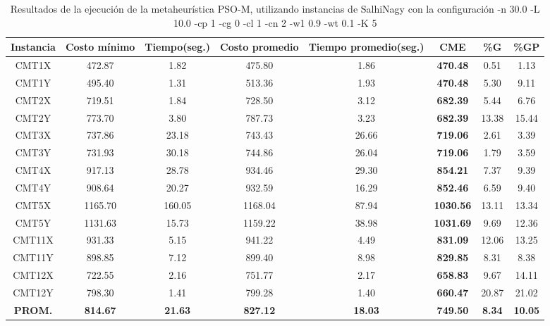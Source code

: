 \begin{table}[h]
\caption{Resultados de la ejecución de la metaheurística PSO-M, utilizando instancias de SalhiNagy con la configuración -n 30.0 -L 10.0 -cp 1 -cg 0 -cl 1 -cn 2 -w1 0.9 -wt 0.1 -K 5}
\centering
\small
\begin{tabular}{c c c c c c c c}
\hline\hline
Instancia & Costo mínimo & Tiempo(seg.) & Costo promedio & Tiempo promedio(seg.) & CME & \%G & \%GP \\ [0.5ex]
\hline
CMT1X & 472.87 & 1.82 & 
475.80 & 1.86 & \bf{470.48} & 
0.51 & 1.13\\CMT1Y & 495.40 & 1.31 & 
513.36 & 1.93 & \bf{470.48} & 
5.30 & 9.11\\CMT2X & 719.51 & 1.84 & 
728.50 & 3.12 & \bf{682.39} & 
5.44 & 6.76\\CMT2Y & 773.70 & 3.80 & 
787.73 & 3.23 & \bf{682.39} & 
13.38 & 15.44\\CMT3X & 737.86 & 23.18 & 
743.43 & 26.66 & \bf{719.06} & 
2.61 & 3.39\\CMT3Y & 731.93 & 30.18 & 
744.86 & 26.04 & \bf{719.06} & 
1.79 & 3.59\\CMT4X & 917.13 & 28.78 & 
934.46 & 29.30 & \bf{854.21} & 
7.37 & 9.39\\CMT4Y & 908.64 & 20.27 & 
932.59 & 16.29 & \bf{852.46} & 
6.59 & 9.40\\CMT5X & 1165.70 & 160.05 & 
1168.04 & 87.94 & \bf{1030.56} & 
13.11 & 13.34\\CMT5Y & 1131.63 & 15.73 & 
1159.22 & 38.98 & \bf{1031.69} & 
9.69 & 12.36\\CMT11X & 931.33 & 5.15 & 
941.22 & 4.49 & \bf{831.09} & 
12.06 & 13.25\\CMT11Y & 898.85 & 7.12 & 
899.40 & 8.98 & \bf{829.85} & 
8.31 & 8.38\\CMT12X & 722.55 & 2.16 & 
751.77 & 2.17 & \bf{658.83} & 
9.67 & 14.11\\CMT12Y & 798.30 & 1.41 & 
799.28 & 1.40 & \bf{660.47} & 
20.87 & 21.02\\\bf{PROM.} & 
\bf{814.67} & \bf{21.63} & \bf{827.12} & \bf{18.03} & \bf{749.50} & \bf{8.34} & \bf{10.05}\\[1ex]\hline
\end{tabular}
\label{table:nonlin}
\end{table}

